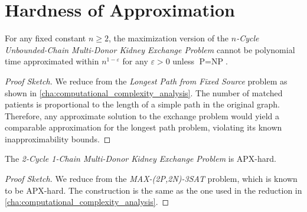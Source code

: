 \section{Hardness of Approximation}


\begin{lemma}
For any fixed constant $n \ge 2$, the maximization version of the \textit{$n$-Cycle Unbounded-Chain Multi-Donor Kidney Exchange Problem} cannot be polynomial time approximated
within $n^{1-\varepsilon}$ for any $\varepsilon  > 0$ unless $\text{P} = \text{NP}$.
\end{lemma}

\begin{proof}[Proof Sketch]
We reduce from the \textit{Longest Path from Fixed Source} problem as shown in \autoref{cha:computational_complexity_analysis}. The number of matched patients is proportional to the length of a simple path in the original graph. Therefore, any approximate solution to the exchange problem would yield a comparable approximation for the longest path problem, violating its known inapproximability bounds.
\end{proof}

\begin{lemma}
The \textit{2-Cycle 1-Chain Multi-Donor Kidney Exchange Problem} is APX-hard.
\end{lemma}

\begin{proof}[Proof Sketch]
We reduce from the \textit{MAX-(2P,2N)-3SAT} problem, which is known to be APX-hard. The construction is the same as the one used in the reduction in \autoref{cha:computational_complexity_analysis}. 
\end{proof}



